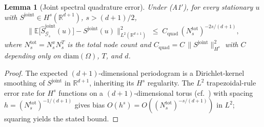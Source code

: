 \documentclass[review,12pt]{elsarticle}
\newtheorem{lemma}{Lemma}
\begin{document}
\begin{lemma}[Joint spectral quadrature error]
\label{lem:joint-quadrature}
Under (A1$'$), for every stationary \(u\) with
\(S^{\mathrm{joint}} \in H^s(\mathbb R^{d+1})\), \(s > (d+1)/2\),
\[
\bigl\|\mathbb E\bigl[\widehat S^{\mathrm{joint}}_{\mathcal G_s}(u)\bigr]
- S^{\mathrm{joint}}(u)\bigr\|^2_{L^2(\mathbb R^{d+1})}
\;\le\; C_{\mathrm{quad}}\,(N_s^{\mathrm{tot}})^{-2s/(d+1)},
\]
where \(N_s^{\mathrm{tot}} = N_s^x N_s^T\) is the total node count
and \(C_{\mathrm{quad}} = C\,\|S^{\mathrm{joint}}\|^2_{H^s}\) with
\(C\) depending only on \(\mathrm{diam}(\Omega)\), \(T\), and \(d\).
\end{lemma}
\begin{proof}
The expected \((d+1)\)-dimensional periodogram is a Dirichlet-kernel
smoothing of \(S^{\mathrm{joint}}\) in \(\mathbb R^{d+1}\), inheriting
its \(H^s\) regularity. The \(L^2\) trapezoidal-rule error rate for
\(H^s\) functions on a \((d+1)\)-dimensional torus
(cf.~\cite{Brillinger1981,Trefethen2000}) with spacing
\(h = (N_s^{\mathrm{tot}})^{-1/(d+1)}\) gives bias
\(O(h^s) = O((N_s^{\mathrm{tot}})^{-s/(d+1)})\) in \(L^2\); squaring
yields the stated bound.
\end{proof}
\end{document}
